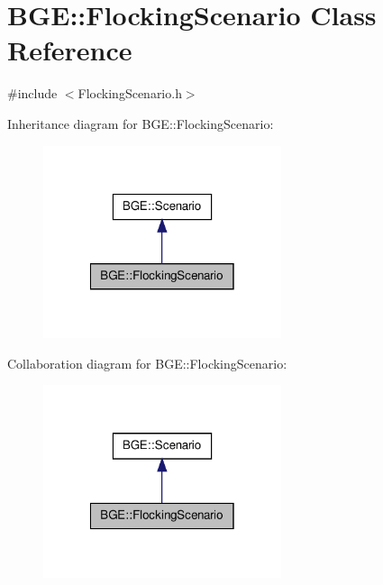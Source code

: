 \hypertarget{class_b_g_e_1_1_flocking_scenario}{\section{B\-G\-E\-:\-:Flocking\-Scenario Class Reference}
\label{class_b_g_e_1_1_flocking_scenario}
}


{\ttfamily \#include $<$Flocking\-Scenario.\-h$>$}



Inheritance diagram for B\-G\-E\-:\-:Flocking\-Scenario\-:
\nopagebreak
\begin{figure}[H]
\begin{center}
\leavevmode
\includegraphics[width=198pt]{class_b_g_e_1_1_flocking_scenario__inherit__graph}
\end{center}
\end{figure}


Collaboration diagram for B\-G\-E\-:\-:Flocking\-Scenario\-:
\nopagebreak
\begin{figure}[H]
\begin{center}
\leavevmode
\includegraphics[width=198pt]{class_b_g_e_1_1_flocking_scenario__coll__graph}
\end{center}
\end{figure}
